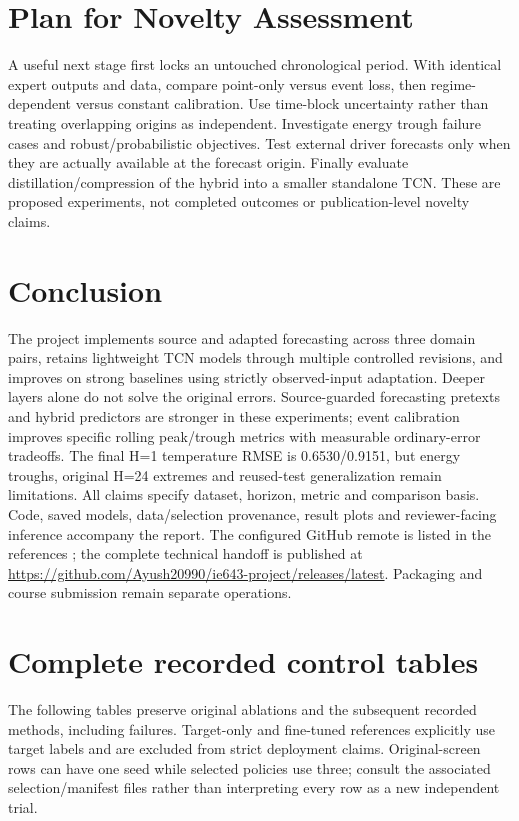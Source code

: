 \documentclass[twoside,english]{article}
\begin{document}
\section{Plan for Novelty Assessment}\label{sec:Plan for Novelty Assessment}
A useful next stage first locks an untouched chronological period. With identical expert outputs and data, compare point-only versus event loss, then regime-dependent versus constant calibration. Use time-block uncertainty rather than treating overlapping origins as independent. Investigate energy trough failure cases and robust/probabilistic objectives. Test external driver forecasts only when they are actually available at the forecast origin. Finally evaluate distillation/compression of the hybrid into a smaller standalone TCN. These are proposed experiments, not completed outcomes or publication-level novelty claims.

\section{Conclusion}\label{sec:conclusion}
The project implements source and adapted forecasting across three domain pairs, retains lightweight TCN models through multiple controlled revisions, and improves on strong baselines using strictly observed-input adaptation. Deeper layers alone do not solve the original errors. Source-guarded forecasting pretexts and hybrid predictors are stronger in these experiments; event calibration improves specific rolling peak/trough metrics with measurable ordinary-error tradeoffs. The final H=1 temperature RMSE is 0.6530/0.9151, but energy troughs, original H=24 extremes and reused-test generalization remain limitations. All claims specify dataset, horizon, metric and comparison basis. Code, saved models, data/selection provenance, result plots and reviewer-facing inference accompany the report. The configured GitHub remote is listed in the references \citep{Code}; the complete technical handoff is published at \url{https://github.com/Ayush20990/ie643-project/releases/latest}. Packaging and course submission remain separate operations.

\clearpage


\clearpage
\appendix
\section{Complete recorded control tables}
The following tables preserve original ablations and the subsequent recorded methods, including failures. Target-only and fine-tuned references explicitly use target labels and are excluded from strict deployment claims. Original-screen rows can have one seed while selected policies use three; consult the associated selection/manifest files rather than interpreting every row as a new independent trial.


\end{document}
